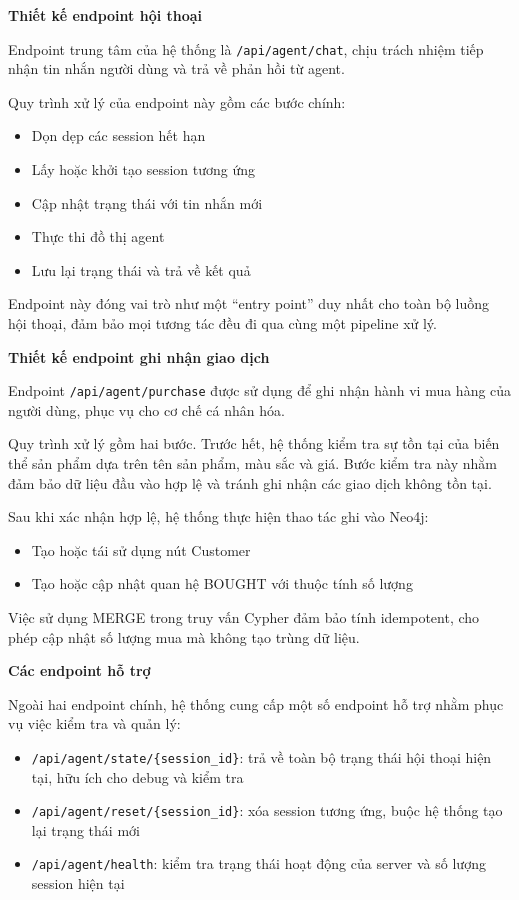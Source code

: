\textbf{Thiết kế endpoint hội thoại}

Endpoint trung tâm của hệ thống là \texttt{/api/agent/chat}, chịu trách nhiệm tiếp nhận tin nhắn người dùng và trả về phản hồi từ agent.

Quy trình xử lý của endpoint này gồm các bước chính:

\begin{itemize}
\item Dọn dẹp các session hết hạn
\item Lấy hoặc khởi tạo session tương ứng
\item Cập nhật trạng thái với tin nhắn mới
\item Thực thi đồ thị agent
\item Lưu lại trạng thái và trả về kết quả
\end{itemize}

Endpoint này đóng vai trò như một ``entry point'' duy nhất cho toàn bộ luồng hội thoại, đảm bảo mọi tương tác đều đi qua cùng một pipeline xử lý.

\textbf{Thiết kế endpoint ghi nhận giao dịch}

Endpoint \texttt{/api/agent/purchase} được sử dụng để ghi nhận hành vi mua hàng của người dùng, phục vụ cho cơ chế cá nhân hóa.

Quy trình xử lý gồm hai bước. Trước hết, hệ thống kiểm tra sự tồn tại của biến thể sản phẩm dựa trên tên sản phẩm, màu sắc và giá. Bước kiểm tra này nhằm đảm bảo dữ liệu đầu vào hợp lệ và tránh ghi nhận các giao dịch không tồn tại.

Sau khi xác nhận hợp lệ, hệ thống thực hiện thao tác ghi vào Neo4j:

\begin{itemize}
\item Tạo hoặc tái sử dụng nút Customer
\item Tạo hoặc cập nhật quan hệ BOUGHT với thuộc tính số lượng
\end{itemize}

Việc sử dụng MERGE trong truy vấn Cypher đảm bảo tính idempotent, cho phép cập nhật số lượng mua mà không tạo trùng dữ liệu.

\textbf{Các endpoint hỗ trợ}

Ngoài hai endpoint chính, hệ thống cung cấp một số endpoint hỗ trợ nhằm phục vụ việc kiểm tra và quản lý:

\begin{itemize}
\item \texttt{/api/agent/state/\{session\_id\}}: trả về toàn bộ trạng thái hội thoại hiện tại, hữu ích cho debug và kiểm tra
\item \texttt{/api/agent/reset/\{session\_id\}}: xóa session tương ứng, buộc hệ thống tạo lại trạng thái mới
\item \texttt{/api/agent/health}: kiểm tra trạng thái hoạt động của server và số lượng session hiện tại
\end{itemize}

